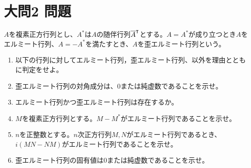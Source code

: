 \documentclass[dvipdfmx]{jsreport}
\begin{document}
\section{大問2 問題}
\begin{tcolorbox} %
	$A$を複素正方行列とし、$A^*$は$A$の随伴行列${\overline{A}}^\intercal$とする。$A= A^*$が成り立つとき$A$をエルミート行列、$A= -A^*$を満たすとき、$A$を歪エルミート行列という。
\begin{enumerate}
	\item 以下の行列に対してエルミート行列，歪エルミート行列、以外を理由とともに判定をせよ。
	\item 歪エルミート行列の対角成分は、0または純虚数であることを示せ。
	\item エルミート行列かつ歪エルミート行列は存在するか。
	\item $M$を複素正方行列とする。$M- M^*$がエルミート行列であることを示せ。
	\item $n$を正整数とする。$n$次正方行列$M, N$がエルミート行列であるとき、$i(MN- NM)$がエルミート行列であることを示せ。
	\item 歪エルミート行列の固有値は0または純虚数であることを示せ。
\end{enumerate}
\end{tcolorbox}
\end{document}
